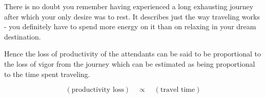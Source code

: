 There is no doubt you remember having experienced a long exhausting journey after which your only desire was to rest. It describes just the way traveling works - you definitely have to spend more energy on it than on relaxing in your dream destination.

Hence the loss of productivity of the attendants can be said to be proportional to the loss of vigor from the journey which can be estimated as being proportional to the time spent traveling.

$$(\text{productivity loss})\quad \propto\quad (\text{travel time})$$


